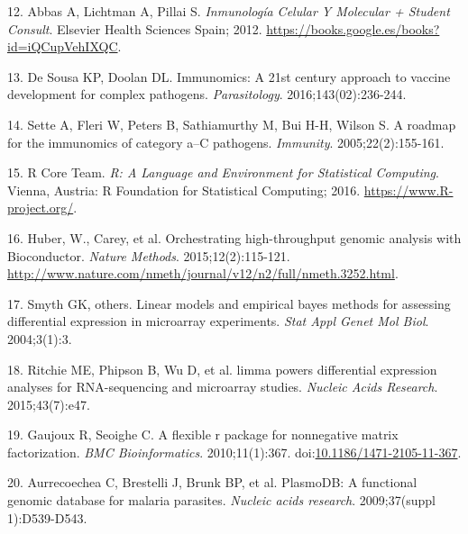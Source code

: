 \documentclass[]{article}
\begin{document}
\hypertarget{ref-abbas2012}{}
12. Abbas A, Lichtman A, Pillai S. \emph{Inmunología Celular Y Molecular
+ Student Consult}. Elsevier Health Sciences Spain; 2012.
\url{https://books.google.es/books?id=iQCupVehIXQC}.

\hypertarget{ref-immunomics2016}{}
13. De Sousa KP, Doolan DL. Immunomics: A 21st century approach to
vaccine development for complex pathogens. \emph{Parasitology}.
2016;143(02):236-244.

\hypertarget{ref-sette2005}{}
14. Sette A, Fleri W, Peters B, Sathiamurthy M, Bui H-H, Wilson S. A
roadmap for the immunomics of category a--C pathogens. \emph{Immunity}.
2005;22(2):155-161.

\hypertarget{ref-R}{}
15. R Core Team. \emph{R: A Language and Environment for Statistical
Computing}. Vienna, Austria: R Foundation for Statistical Computing;
2016. \url{https://www.R-project.org/}.

\hypertarget{ref-Biobase}{}
16. Huber, W., Carey, et al. Orchestrating high-throughput genomic
analysis with Bioconductor. \emph{Nature Methods}. 2015;12(2):115-121.
\url{http://www.nature.com/nmeth/journal/v12/n2/full/nmeth.3252.html}.

\hypertarget{ref-smyth2004ebayes}{}
17. Smyth GK, others. Linear models and empirical bayes methods for
assessing differential expression in microarray experiments. \emph{Stat
Appl Genet Mol Biol}. 2004;3(1):3.

\hypertarget{ref-limma}{}
18. Ritchie ME, Phipson B, Wu D, et al. limma powers differential
expression analyses for RNA-sequencing and microarray studies.
\emph{Nucleic Acids Research}. 2015;43(7):e47.

\hypertarget{ref-Gaujoux2010NMF}{}
19. Gaujoux R, Seoighe C. A flexible r package for nonnegative matrix
factorization. \emph{BMC Bioinformatics}. 2010;11(1):367.
doi:\href{https://doi.org/10.1186/1471-2105-11-367}{10.1186/1471-2105-11-367}.

\hypertarget{ref-plasmodb}{}
20. Aurrecoechea C, Brestelli J, Brunk BP, et al. PlasmoDB: A functional
genomic database for malaria parasites. \emph{Nucleic acids research}.
2009;37(suppl 1):D539-D543.
\end{document}

